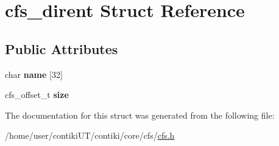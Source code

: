 \hypertarget{structcfs__dirent}{}\section{cfs\+\_\+dirent Struct Reference}
\label{structcfs__dirent}
\subsection*{Public Attributes}
\begin{DoxyCompactItemize}
\item 
\hypertarget{structcfs__dirent_a0997c9f993f6b5ebeaddebeba9c0089d}{}char {\bfseries name} \mbox{[}32\mbox{]}\label{structcfs__dirent_a0997c9f993f6b5ebeaddebeba9c0089d}

\item 
\hypertarget{structcfs__dirent_acd456d3944ddba3b06fe6bdaf4ec99b7}{}cfs\+\_\+offset\+\_\+t {\bfseries size}\label{structcfs__dirent_acd456d3944ddba3b06fe6bdaf4ec99b7}

\end{DoxyCompactItemize}


The documentation for this struct was generated from the following file\+:\begin{DoxyCompactItemize}
\item 
/home/user/contiki\+U\+T/contiki/core/cfs/\hyperlink{cfs_8h}{cfs.\+h}\end{DoxyCompactItemize}
